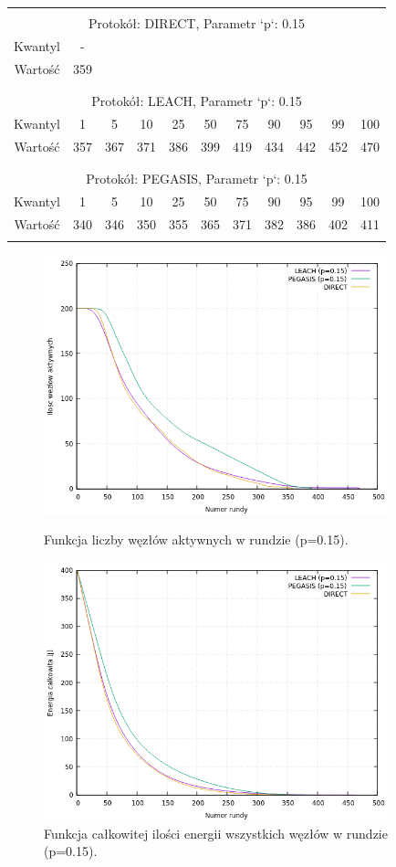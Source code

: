\documentclass[a4paper,12pt,twoside,openany]{report}
\begin{document}
\begin{longtable}{*{11}{c}}
\toprule \\*
\multicolumn{11}{c}{Protokół: DIRECT, Parametr `p`: 0.15} \\*
Kwantyl	& -	\\*
Wartość	& 359	\\*
\midrule \\*
\\*
\multicolumn{11}{c}{Protokół: LEACH, Parametr `p`: 0.15} \\*
Kwantyl	& 1	& 5	& 10	& 25	& 50	& 75	& 90	& 95	& 99	& 100	\\*
Wartość	& 357	& 367	& 371	& 386	& 399	& 419	& 434	& 442	& 452	& 470	\\*
\midrule \\*
\\*
\multicolumn{11}{c}{Protokół: PEGASIS, Parametr `p`: 0.15} \\*
Kwantyl	& 1	& 5	& 10	& 25	& 50	& 75	& 90	& 95	& 99	& 100	\\*
Wartość	& 340	& 346	& 350	& 355	& 365	& 371	& 382	& 386	& 402	& 411	\\*	
\bottomrule \\*
\end{longtable}

\begin{figure}[H]
 \centering
 \includegraphics[width=10cm]{images/gnuplot/test_4/nodes_in_round_p015.png}
 \caption{Funkcja liczby węzłów aktywnych w rundzie (p=0.15).}
 \includegraphics[width=10cm]{images/gnuplot/test_4/energy_in_round_p015.png}
 \caption{Funkcja całkowitej ilości energii wszystkich węzłów w rundzie (p=0.15).}
\end{figure}
\end{document}
